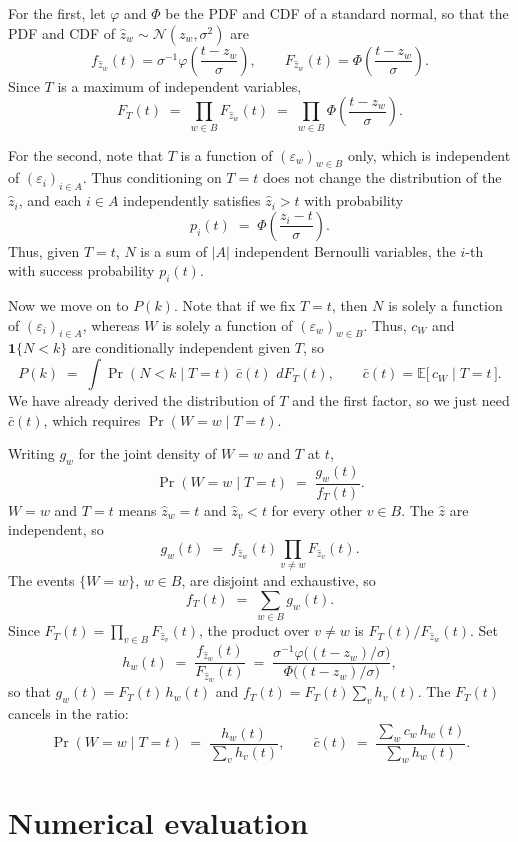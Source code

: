 \documentclass[12pt]{article}
\begin{document}
For the first, let $\varphi$ and $\Phi$ be the PDF and CDF of a standard
normal, so that the PDF and CDF of $\hat z_w \sim \mathcal N(z_w, \sigma^2)$
are
\[ f_{\hat z_w}(t) = \sigma^{-1}\varphi\!\left(\frac{t - z_w}{\sigma}\right), \qquad
   F_{\hat z_w}(t) = \Phi\!\left(\frac{t - z_w}{\sigma}\right). \]
Since $T$ is a maximum of independent variables,
\[ F_T(t) \;=\; \prod_{w \in B} F_{\hat z_w}(t)
   \;=\; \prod_{w \in B} \Phi\!\left(\frac{t - z_w}{\sigma}\right). \]

For the second, note that $T$ is a function of $(\varepsilon_w)_{w \in B}$
only, which is independent of $(\varepsilon_i)_{i \in A}$. Thus conditioning on
$T = t$ does not change the distribution of the $\hat z_i$, and each $i \in A$
independently satisfies $\hat z_i > t$ with probability
\[ p_i(t) \;=\; \Phi\!\left(\frac{z_i - t}{\sigma}\right). \]
Thus, given $T = t$, $N$ is a sum of $|A|$ independent Bernoulli
variables, the $i$-th with success probability $p_i(t)$.

Now we move on to $P(k)$. Note that if we fix $T = t$, then $N$ is solely a function of $(\varepsilon_i)_{i \in A}$, whereas $W$ is solely a
function of $(\varepsilon_w)_{w \in B}$. Thus, $c_W$ and $\mathbf 1\{N < k\}$ are conditionally independent given $T$, so
\[ P(k) \;=\; \int \Pr(N < k \mid T = t)\; \bar c(t) \,\, dF_T(t), \qquad
   \bar c(t) = \mathbb E\bigl[\, c_{W} \mid T = t \,\bigr]. \]
We have already derived the distribution of $T$ and the first factor, so we just need $\bar c(t)$, which requires
$\Pr(W = w \mid T = t)$.

Writing $g_w$ for the joint density of $W = w$ and $T$ at $t$,
\[ \Pr(W = w \mid T = t) \;=\; \frac{g_w(t)}{f_T(t)}. \]
$W = w$ and $T = t$ means $\hat z_w = t$ and $\hat z_v < t$ for every
other $v \in B$. The $\hat z$ are independent, so
\[ g_w(t) \;=\; f_{\hat z_w}(t) \prod_{v \ne w} F_{\hat z_v}(t). \]
The events $\{W = w\}$, $w \in B$, are disjoint and exhaustive, so
\[ f_T(t) \;=\; \sum_{w \in B} g_w(t). \]
Since $F_T(t) = \prod_{v \in B} F_{\hat z_v}(t)$, the product over $v \ne w$ is
$F_T(t) \big/ F_{\hat z_w}(t)$. Set
\[ h_w(t) \;=\; \frac{f_{\hat z_w}(t)}{F_{\hat z_w}(t)}
   \;=\; \frac{\sigma^{-1}\varphi\bigl((t - z_w)/\sigma\bigr)}
              {\Phi\bigl((t - z_w)/\sigma\bigr)}, \]
so that $g_w(t) = F_T(t)\, h_w(t)$ and $f_T(t) = F_T(t) \sum_v h_v(t)$. The
$F_T(t)$ cancels in the ratio:
\[ \Pr(W = w \mid T = t) \;=\; \frac{h_w(t)}{\sum_v h_v(t)}, \qquad
   \bar c(t) \;=\; \frac{\sum_w c_w\, h_w(t)}{\sum_w h_w(t)}. \]

\section{Numerical evaluation}
\label{sec:computation}
\end{document}
